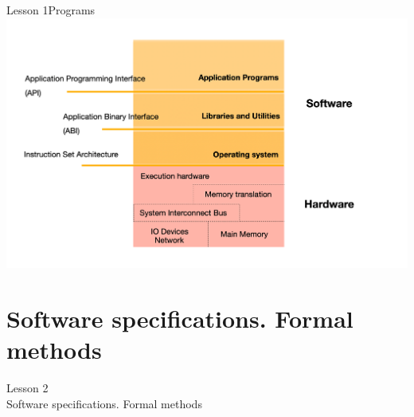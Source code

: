 \documentclass[aspectratio=1610]{beamer}
\begin{document}
\begin{frame}{Lesson 1}{Programs}
\includegraphics[scale=0.15]{Images/sfwhdw}
\end{frame}








\section{Software specifications. Formal methods}


\begin{frame}
\begin{center}
\Huge Lesson 2\\
Software specifications. Formal methods
\end{center}
\end{frame}
\end{document}
